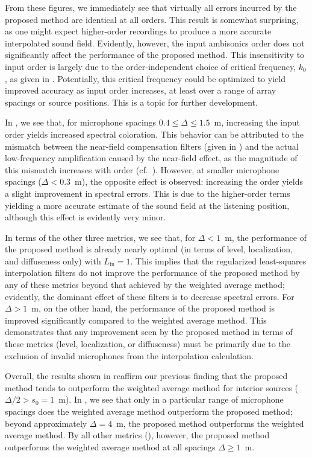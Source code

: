 From these figures, we immediately see that virtually all errors incurred by the proposed method are identical at all orders.
This result is somewhat surprising, as one might expect higher-order recordings to produce a more accurate interpolated sound field.
Evidently, however, the input ambisonics order does not significantly affect the performance of the proposed method.
This insensitivity to input order is largely due to the order-independent choice of critical frequency, $k_0$, as given in .
Potentially, this critical frequency could be optimized to yield improved accuracy as input order increases, at least over a range of array spacings or source positions.
This is a topic for further development.

In , we see that, for microphone spacings $0.4 \leq \Delta \leq 1.5$~m, increasing the input order yields increased spectral coloration.
This behavior can be attributed to the mismatch between the near-field compensation filters (given in ) and the actual low-frequency amplification caused by the near-field effect, as the magnitude of this mismatch increases with order (cf.~\citet[Fig.~6]{Daniel2003b}).
However, at smaller microphone spacings ($\Delta < 0.3$~m), the opposite effect is observed: increasing the order yields a slight improvement in spectral errors.
This is due to the higher-order terms yielding a more accurate estimate of the sound field at the listening position, although this effect is evidently very minor.

In terms of the other three metrics, we see that, for $\Delta < 1$~m, the performance of the proposed method is already nearly optimal (in terms of level, localization, and diffuseness only) with $L_\textrm{in} = 1$.
This implies that the regularized least-squares interpolation filters do not improve the performance of the proposed method by any of these metrics beyond that achieved by the weighted average method; evidently, the dominant effect of these filters is to decrease spectral errors.
For $\Delta > 1$~m, on the other hand, the performance of the proposed method is improved significantly compared to the weighted average method.
This demonstrates that any improvement seen by the proposed method in terms of these metrics (level, localization, or diffuseness) must be primarily due to the exclusion of invalid microphones from the interpolation calculation.

Overall, the results shown in  reaffirm our previous finding that the proposed method tends to outperform the weighted average method for interior sources ($\Delta/2 > s_0 = 1$~m).
In , we see that only in a particular range of microphone spacings does the weighted average method outperform the proposed method; beyond approximately $\Delta = 4$~m, the proposed method outperforms the weighted average method.
By all other metrics (), however, the proposed method outperforms the weighted average method at all spacings $\Delta \geq 1$~m.